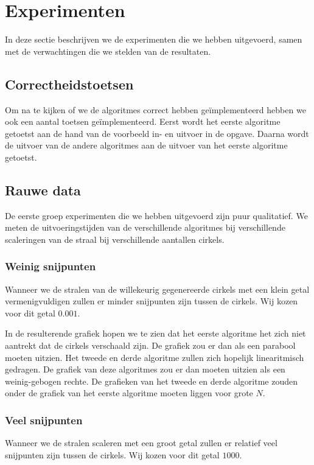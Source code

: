 \newpage
\section{Experimenten}
In deze sectie beschrijven we de experimenten die we hebben uitgevoerd, samen met de verwachtingen die we stelden van de resultaten.

\subsection{Correctheidstoetsen}
Om na te kijken of we de algoritmes correct hebben ge\"implementeerd hebben we ook een aantal toetsen ge\"implementeerd.
Eerst wordt het eerste algoritme getoetst aan de hand van de voorbeeld in- en uitvoer in de opgave.
Daarna wordt de uitvoer van de andere algoritmes aan de uitvoer van het eerste algoritme getoetst.

\subsection{Rauwe data}
De eerste groep experimenten die we hebben uitgevoerd zijn puur qualitatief. We meten de uitvoeringstijden van de verschillende algoritmes bij verschillende scaleringen van de straal bij verschillende aantallen cirkels.

\subsubsection{Weinig snijpunten}
Wanneer we de stralen van de willekeurig gegenereerde cirkels met een klein getal vermenigvuldigen zullen er minder snijpunten zijn tussen de cirkels. Wij kozen voor dit getal $0.001$.

In de resulterende grafiek hopen we te zien dat het eerste algoritme het zich niet aantrekt dat de cirkels verschaald zijn. De grafiek zou er dan als een parabool moeten uitzien. Het tweede en derde algoritme zullen zich hopelijk linearitmisch gedragen. De grafiek van deze algoritmes zou er dan moeten uitzien als een weinig-gebogen rechte. De grafieken van het tweede en derde algoritme zouden onder de grafiek van het eerste algoritme moeten liggen voor grote $N$.

\subsubsection{Veel snijpunten}
Wanneer we de stralen scaleren met een groot getal zullen er relatief veel snijpunten zijn tussen de cirkels. Wij kozen voor dit getal $1000$.

